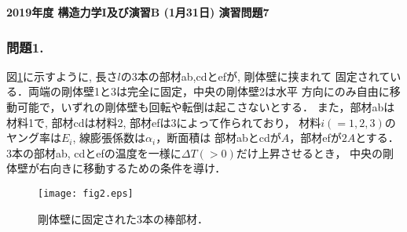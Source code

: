 \documentclass[10pt,a4j]{jarticle}
\newlength{\minitwocolumn}
\begin{document}
\newcommand{\fat}[1]{\mbox{\boldmath $#1$}}
\newcommand{\D}{\partial}
\newcommand{\w}{\omega}
\newcommand{\ga}{\alpha}
\newcommand{\gb}{\beta}
\newcommand{\gx}{\xi}
\newcommand{\gz}{\zeta}
\newcommand{\vhat}[1]{\hat{\fat{#1}}}
\newcommand{\spc}{\vspace{0.7\baselineskip}}
\newcommand{\halfspc}{\vspace{0.3\baselineskip}}

\pagestyle{empty}
\newcommand{\twofig}[2]
 {
   \begin{figure}[h]
     \begin{minipage}[t]{\minitwocolumn}
         \begin{center}   #1
         \end{center}
     \end{minipage}
         \hspace{\columnsep}
     \begin{minipage}[t]{\minitwocolumn}
         \begin{center} #2
         \end{center}
     \end{minipage}
   \end{figure}
 }
\begin{center}
{\Large \bf 2019年度 構造力学I及び演習B (1月31日) 演習問題7 } \\
\end{center}
\subsubsection*{問題1.}
図\ref{fig:fig2}に示すように, 長さ$l$の3本の部材ab,cdとefが, 剛体壁に挟まれて
固定されている．両端の剛体壁1と3は完全に固定，中央の剛体壁2は水平
方向にのみ自由に移動可能で，いずれの剛体壁も回転や転倒は起こさないとする．
また，部材abは材料1で, 部材cdは材料2, 部材efは3によって作られており，
材料$i(=1,2,3)$のヤング率は$E_i$, 線膨張係数は$\alpha_i$，断面積は
部材abとcdが$A$，部材efが$2A$とする．
3本の部材ab, cdとefの温度を一様に$\Delta T(>0)$だけ上昇させるとき，
中央の剛体壁が右向きに移動するための条件を導け．
\begin{figure}[h]
	\begin{center}
	\texttt{[image: fig2.eps]} 
	\end{center}
	\caption{剛体壁に固定された3本の棒部材．} 
	\label{fig:fig2}
\end{figure}
\end{document}
